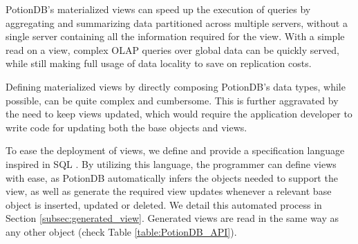 \documentclass[sigplan,10pt]{acmart}
\begin{document}
PotionDB's materialized views can speed up the execution of queries by aggregating and  summarizing data partitioned across multiple servers, without a single server containing all the information required for the view.
With a simple read on a view, complex OLAP queries over global data can be quickly served, while still making full usage of data locality to save on replication costs.

Defining materialized views by directly composing PotionDB's data types, while possible, can be quite complex and cumbersome.
This is further aggravated by the need to keep views updated, which would require the application developer to write code for updating both the base objects and views.

To ease the deployment of views, we define and provide a specification language inspired in SQL \cite{sequel}.
By utilizing this language, the programmer can define views with ease, as PotionDB automatically infers the objects needed to support the view, as well as generate the required view updates whenever a relevant base object is inserted, updated or deleted. 
We detail this automated process in Section \ref{subsec:generated_view}.
Generated views are read in the same way as any other object (check Table \ref{table:PotionDB_API}).
\end{document}
